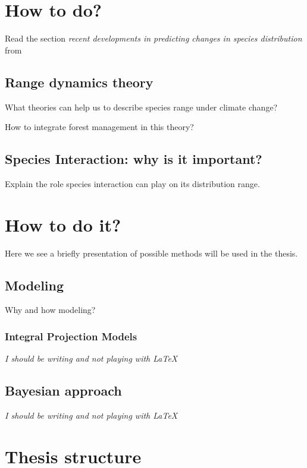 \documentclass[a4paper,12pt,twoside]{article}
\begin{document}
\section{How to do?}

Read the section \textit{recent developments in predicting changes in species distribution} from \cite{Ehrlen2015c}

\subsection*{Range dynamics theory}

What theories can help us to describe species range under climate change?

How to integrate forest management in this theory?

\subsection*{Species Interaction: why is it important?}

Explain the role species interaction can play on its distribution range.

\section{How to do it?}

Here we see a briefly presentation of possible methods will be used in the thesis.

\subsection*{Modeling}

Why and how modeling?

\subsubsection*{Integral Projection Models}

\textit{I should be writing and not playing with \LaTeX}

\subsection*{Bayesian approach}

\textit{I should be writing and not playing with \LaTeX}

\section{Thesis structure}
\end{document}
